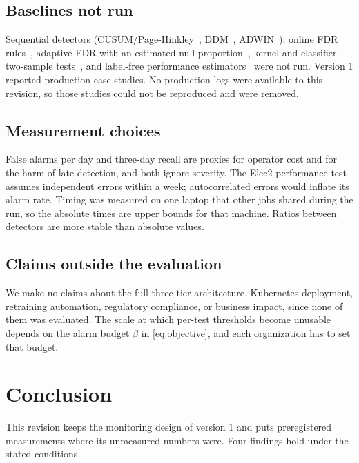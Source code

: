 \documentclass[journal]{IEEEtran}
\begin{document}
\subsection{Baselines not run}

Sequential detectors (CUSUM\slash Page-Hinkley~\cite{page1954}, DDM~\cite{gama2004}, ADWIN~\cite{bifet2007}), online FDR rules~\cite{javanmard2018,ramdas2017online}, adaptive FDR with an estimated null proportion~\cite{storey2002}, kernel and classifier two-sample tests~\cite{gretton2008,rabanser2019}, and label-free performance estimators~\cite{garg2022,nannyml} were not run. Version 1 reported production case studies. No production logs were available to this revision, so those studies could not be reproduced and were removed.

\subsection{Measurement choices}

False alarms per day and three-day recall are proxies for operator cost and for the harm of late detection, and both ignore severity. The Elec2 performance test assumes independent errors within a week; autocorrelated errors would inflate its alarm rate. Timing was measured on one laptop that other jobs shared during the run, so the absolute times are upper bounds for that machine. Ratios between detectors are more stable than absolute values.

\subsection{Claims outside the evaluation}

We make no claims about the full three-tier architecture, Kubernetes deployment, retraining automation, regulatory compliance, or business impact, since none of them was evaluated. The scale at which per-test thresholds become unusable depends on the alarm budget $\beta$ in \eqref{eq:objective}, and each organization has to set that budget.

\section{Conclusion}
\label{sec:conclusion}

This revision keeps the monitoring design of version 1 and puts preregistered measurements where its unmeasured numbers were. Four findings hold under the stated conditions.
\end{document}
